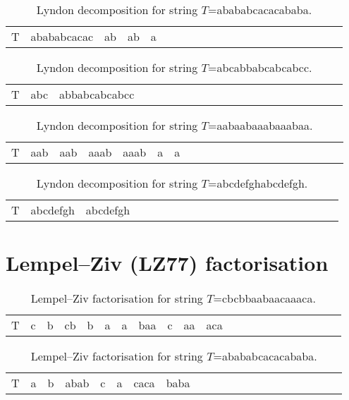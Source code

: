 \begin{table}[h]
  \footnotesize
  \begin{tabular}{c|cccccccccccccccccccc}
    T & abababcacac & ab & ab & a
  \end{tabular}
  \caption{Lyndon decomposition for string $T$=abababcacacababa.}
\end{table}

\begin{table}[h]
  \footnotesize
  \begin{tabular}{c|cccccccccccccccccccc}
    T & abc & abbabcabcabcc
  \end{tabular}
  \caption{Lyndon decomposition for string $T$=abcabbabcabcabcc.}
\end{table}

\begin{table}[h]
  \footnotesize
  \begin{tabular}{c|cccccccccccccccccccc}
    T & aab & aab & aaab & aaab & a & a 
  \end{tabular}
  \caption{Lyndon decomposition for string $T$=aabaabaaabaaabaa.}
\end{table}

\begin{table}[h]
  \footnotesize
  \begin{tabular}{c|cccccccccccccccccccc}
    T & abcdefgh & abcdefgh
  \end{tabular}
  \caption{Lyndon decomposition for string $T$=abcdefghabcdefgh.}
\end{table}

\section{Lempel--Ziv (LZ77) factorisation}

\begin{table}[h]
  \footnotesize
  \begin{tabular}{c|cccccccccccccccccccc}
    T & c & b & cb & b & a & a & baa & c & aa & aca 
  \end{tabular}
  \caption{Lempel--Ziv factorisation for string $T$=cbcbbaabaacaaaca.}
\end{table}

\begin{table}[h]
  \footnotesize
  \begin{tabular}{c|cccccccccccccccccccc}
    T & a & b & abab & c & a & caca & baba
  \end{tabular}
  \caption{Lempel--Ziv factorisation for string $T$=abababcacacababa.}
\end{table}

